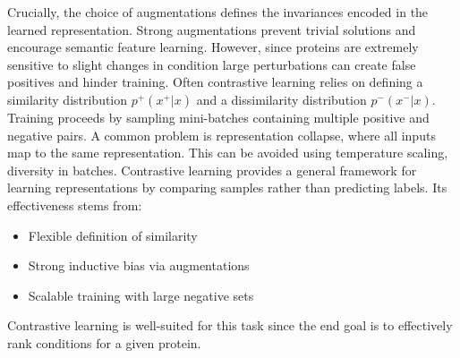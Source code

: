 Crucially, the choice of augmentations defines the invariances encoded in the learned representation. Strong augmentations prevent trivial solutions and encourage semantic feature learning. However, since proteins are extremely sensitive to slight changes in condition large perturbations can create false positives and hinder training. 
Often contrastive learning relies on defining a similarity distribution $p^+(x^+|x)$ and a dissimilarity distribution $p^-(x^-|x)$. 
Training proceeds by sampling mini-batches containing multiple positive and negative pairs. A common problem is representation collapse, where all inputs map to the same representation. This can be avoided using temperature scaling, diversity in batches.
Contrastive learning provides a general framework for learning representations by comparing samples rather than predicting labels. Its effectiveness stems from:
\begin{itemize}
    \item Flexible definition of similarity
    \item Strong inductive bias via augmentations
    \item Scalable training with large negative sets
\end{itemize}

Contrastive learning is well-suited for this task since the end goal is to effectively rank conditions for a given protein. 